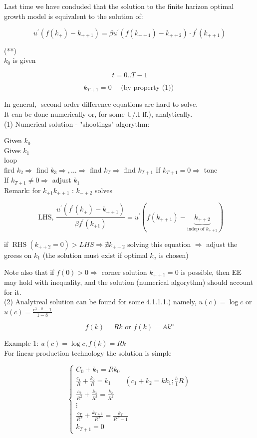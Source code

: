 \documentclass[10pt]{article}
\begin{document}
Last time we have conduded that the solution to the finite harizon optimal growth model is equivalent to the solution of:

$$
u^{\prime}\left(f\left(k_{+}\right)-k_{++1}\right)=\beta u^{\prime}\left(f\left(k_{++1}\right)-k_{++2}\right) \cdot f^{\prime}\left(k_{++1}\right)
$$

(**)\\
$k_{0}$ is given

$$
t=0 . . T-1
$$

$$
k_{T+1}=0 \quad \text { (by property (1)) }
$$

In general,- second-order difference equations are hard to solve.\\
It can be done numerically or, for some U/.I ff.), analytically.\\
(1) Numerical solution - "shootings" algorythm:

Given $k_{0}$\\
Gives $k_{1}$\\
loop\\
fird $k_{2} \Rightarrow$ find $k_{3} \Rightarrow, \ldots \Rightarrow$ find $k_{T} \Rightarrow$ find $k_{T+1}$ If $k_{T+1}=0 \Rightarrow$ tone\\
If $k_{T+1} \neq 0 \Rightarrow$ adjust $k_{1}$\\
Remark: for $k_{+1} k_{++1}$ : $k_{-+2}$ solves

$$
\text { LHS, } \frac{u^{\prime}\left(f^{\prime}\left(k_{+}\right)-k_{++1}\right)}{\beta f^{\prime}\left(k_{+1}\right)}=u^{\prime}(f\left(k_{++1}\right)-\underbrace{k_{++2}}_{\text {indep of } k_{++2}})
$$

if $\operatorname{RHS}\left(k_{++2}=0\right)>L H S \Rightarrow \nexists k_{++2}$ solving this equation $\Rightarrow$ adjust the greess on $k_{1}$ (the solution must exist if optimal $k_{a}$ is chosen)

Note also that if $f(0)>0 \Rightarrow$ corner solution $k_{++1}=0$ is possible, then EE may hold with inequality, and the solution (numerical algorythm) should account for it.\\
(2) Analytreal solution can be found for some 4.1.1.1.) namely, $u(c)=\log c$ or $u(c)=\frac{c^{1-8}-1}{1-8}$

$$
f(k)=R k \text { or } f(k)=A k^{\alpha}
$$

Example 1: $u(c)=\log c, f(k)=R k$\\
For linear production technology the solution is simple

$$
\left\{\begin{array}{l}
C_{0}+k_{1}=R k_{0} \\
\frac{c_{1}}{R}+\frac{k_{2}}{R}=k_{1} \quad \quad\left(c_{1}+k_{2}=k k_{1} ; \frac{h}{1} R\right) \\
\frac{c_{2}}{R^{2}}+\frac{k_{3}}{R^{3}}=\frac{k_{2}}{R^{2}} \\
\vdots \\
\frac{c_{T}}{R^{T}}+\frac{k_{T+1}}{R^{T}}=\frac{k_{T}}{R^{T}-1} \\
k_{T+1}=0
\end{array}\right.
$$
\end{document}
